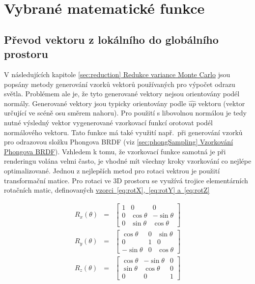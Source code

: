 \documentclass[czech,master]{diploma}
\newcommand{\uvec}[1]{\hat{#1}}
\begin{document}
\chapter{Vybrané matematické funkce}

\section{Převod vektoru z lokálního do globálního prostoru}
V následujících kapitole \hyperref[sec:reduction]{\ref{sec:reduction} Redukce variance Monte Carlo} jsou popsány metody generování vzorků vektorů používaných pro výpočet odrazu světla. Problémem ale je, že tyto generované vektory nejsou orientovány podél normály. Generované vektory jsou typicky orientovány podle \(\uvec{up}\) vektoru (vektor určující ve scéně osu směrem nahoru). Pro použití s libovolnou normálou je tedy nutné výsledný vektor vygenerované vzorkovací funkcí orotovat podél normálového vektoru. Tato funkce má také využití např.\ při generování vzorků pro odrazovou složku Phongova BRDF (viz \hyperref[sec:phongSampling]{\ref{sec:phongSampling} Vzorkování Phongova BRDF}). Vzhledem k tomu, že vzorkovací funkce samotná je při renderingu volána velmi často, je vhodné mít všechny kroky vzorkování co nejlépe optimalizované. Jednou z nejlepších metod pro rotaci vektrou je použití transformační matice. Pro rotaci ve 3D prostoru se využívá trojice elementárních rotačních matic, definovaných \hyperref[eq:rotX]{vzorci~\ref{eq:rotX},~\ref{eq:rotY} a~\ref{eq:rotZ}}~\cite{HughesDamEtAl13}\par
\begin{eqnarray}
  R_x(\theta) & = & \begin{bmatrix}
    1 & 0          & 0           \\
    0 & \cos\theta & -\sin\theta \\
    0 & \sin\theta & \cos\theta
  \end{bmatrix} \label{eq:rotX} \\
  R_y(\theta) & = & \begin{bmatrix}
    \cos\theta  & 0 & \sin\theta \\
    0           & 1 & 0          \\
    -\sin\theta & 0 & \cos\theta
  \end{bmatrix} \label{eq:rotY} \\
  R_z(\theta) & = & \begin{bmatrix}
    \cos\theta & -\sin\theta & 0 \\
    \sin\theta & \cos\theta  & 0 \\
    0          & 0           & 1
  \end{bmatrix}\label{eq:rotZ}
\end{eqnarray}
\end{document}
